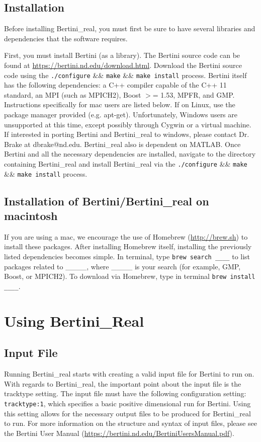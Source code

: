 \documentclass[10pt]{article}
\begin{document}
\subsection{Installation}
Before installing Bertini\_real, you must first be sure to have several libraries and dependencies that the software requires. \par
First, you must install Bertini (as a library).  The Bertini source code can be found \newline at \url{https://bertini.nd.edu/download.html}. Download the Bertini source code using the \texttt{./configure} \&\& \texttt{make} \&\& \texttt{make install} process.  Bertini itself has the following dependencies: a C++ compiler capable of the C++ 11 standard, an MPI (such as MPICH2), Boost $>$= 1.53, MPFR, and GMP. Instructions specifically for mac users are listed below. If on Linux, use the package manager provided (e.g. apt-get). Unfortunately, Windows users are unsupported at this time, except possibly through Cygwin or a virtual machine. If interested in porting Bertini and Bertini\_real to windows, please contact Dr. Brake at dbrake@nd.edu. Bertini\_real also is dependent on MATLAB. Once Bertini and all the necessary dependencies are installed, navigate to the directory containing Bertini\_real and install Bertini\_real via the \texttt{./configure} \&\& \texttt{make} \&\& \texttt{make install} process. \par
\subsection{Installation of Bertini/Bertini\_real on macintosh}

\indent If you are using a mac, we encourage the use of Homebrew (\url{http://brew.sh}) to install these packages. After installing Homebrew itself, installing the previously listed dependencies becomes simple. In terminal,  type \texttt{brew search \_\_\_\_} to list packages related to \_\_\_\_, where \_\_\_\_ is your search (for example, GMP, Boost, or MPICH2). To download via Homebrew, type in terminal \texttt{brew install \_\_\_\_}.


\clearpage
\section{Using Bertini\_Real}
\label{sec:running}

\subsection{Input File}
Running Bertini\_real starts with creating a valid input file for Bertini to run on.  With regards to Bertini\_real, the important point about the input file is the tracktype setting. The input file must have the following configuration setting: \texttt{tracktype:1}, which specifies a basic positive dimensional run for Bertini. Using this setting allows for the necessary output files to be produced for Bertini\_real to run. For more information on the structure and syntax of input files, please see the Bertini User Manual  (\url{https://bertini.nd.edu/BertiniUsersManual.pdf}).
\end{document}
